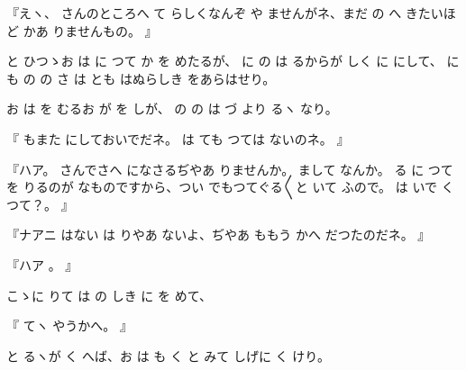 『えヽ、
さんのところへ
て
らしくなんぞ
や
ませんがネ、まだ
の
へ
きたいほど
かあ
りませんもの。
』

と
ひつゝお
は
に
つて
か
を
めたるが、
に
の
は
るからが
しく
に
にして、
にも
の
の
さ
は
とも
はぬらしき
をあらはせり。

お
は
を
むるお
が
を
しが、
の
の
は
づ
より
るヽ
なり。

『
もまた
にしておいでだネ。
は
ても
つては
ないのネ。
』

『ハア。
さんでさへ
になさるぢやあ
りませんか。
まして
なんか。
る
に
つて
を
りるのが
なものですから、つい
でもつてぐる〳〵と
いて
ふので。
は
いで
くつて？。
』

『ナアニ
はない
は
りやあ
ないよ、ぢやあ
ももう
かへ
だつたのだネ。
』

『ハア
。
』

こゝに
りて
は
の
しき
に
を
めて、

『
てヽ
やうかへ。
』

と
るヽが
く
へば、お
は
も
く
と
みて
しげに
く
けり。


